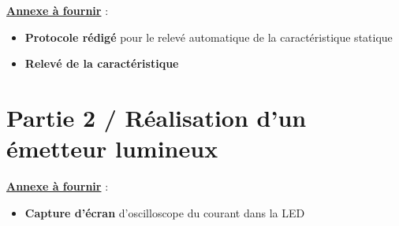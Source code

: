 \noindent
\underline{\textbf{Annexe à fournir}} :

\begin{itemize}[label=$\square$]
	\item \textbf{Protocole rédigé} pour le relevé automatique de la caractéristique statique
	\item \textbf{Relevé de la caractéristique}
\end{itemize}

\section{Partie 2 / Réalisation d'un émetteur lumineux}

\noindent
\begin{minipage}{0.48\linewidth}
\end{minipage}
\hfill
\begin{minipage}{0.48\linewidth}
\end{minipage}

\medskip

\noindent
{}

\medskip

\noindent
\underline{\textbf{Annexe à fournir}} :

\begin{itemize}[label=$\square$]
	\item \textbf{Capture d'écran} d'oscilloscope du courant dans la LED
\end{itemize}

\medskip

\noindent
\begin{minipage}{0.23\linewidth}
\end{minipage}
\hfill
\begin{minipage}{0.23\linewidth}
\end{minipage}
\hfill
\begin{minipage}{0.23\linewidth}
\hfill
\end{minipage}
\hfill
\begin{minipage}{0.23\linewidth}
\hfill
\end{minipage}

